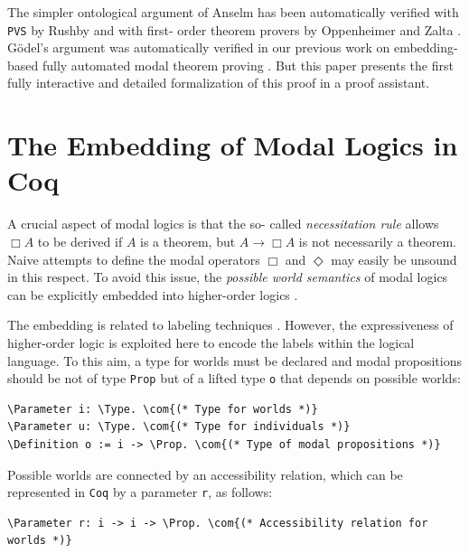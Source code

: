 \documentclass{llncs}
\newcommand{\imp}{\rightarrow}
\newcommand{\red}[1]{\textcolor[rgb]{1,0,0}{#1}}
\newcommand{\blue}[1]{\textcolor[rgb]{0,0,1}{#1}}
\newcommand{\brown}[1]{\textcolor[rgb]{0.8,0.6,0.4}{#1}}
\newcommand{\Parameter}{\red{Parameter}}
\newcommand{\Definition}{\red{Definition}}
\newcommand{\Prop}{\blue{Prop}}
\newcommand{\Type}{\blue{Type}}
\newcommand{\com}[1]{\brown{#1}}
\newcommand{\Coq}{\texttt{Coq}\xspace}
\begin{document}
The simpler ontological argument of Anselm has been automatically
verified with \texttt{PVS} by Rushby \cite{Rushby} and with first-
order theorem provers by Oppenheimer and Zalta \cite{Zalta}. Gödel's
argument was automatically verified in our previous work on embedding-
based fully automated modal theorem proving \cite{ArXiv,AFP}. But this
paper presents the first fully interactive and detailed formalization
of this proof in a proof assistant.



\section{The Embedding of Modal Logics in Coq}
\label{sec:Embedding}

A crucial aspect of modal logics \cite{ModalLogic} is that the so-
called \emph{necessitation rule} allows $\Box A$ to be derived if $A$
is a theorem, but $A \imp \Box A$ is not necessarily a theorem. Naive
attempts to define the modal operators $\Box$ and $\Diamond$ may
easily be unsound in this respect. To avoid this issue, the
\emph{possible world semantics} of modal logics can be explicitly
embedded into higher-order logics \cite{J23,B9}.

The embedding is related to labeling techniques \cite{Labels}.
However, the expressiveness of higher-order logic is exploited here to
encode the labels within the logical language. To this aim, a type for
worlds must be declared and modal propositions should be not of type
\texttt{Prop} but of a lifted type \texttt{o} that depends on possible
worlds:

\newcommand{\verbsize}{\small}

\begin{small}
\begin{Verbatim}[commandchars=\\\{\},fontsize=\verbsize]
\Parameter i: \Type. \com{(* Type for worlds *)}
\Parameter u: \Type. \com{(* Type for individuals *)}
\Definition o := i -> \Prop. \com{(* Type of modal propositions *)}
\end{Verbatim}
\end{small}

\noindent
Possible worlds are connected by an accessibility relation, 
which can be represented in \Coq by a parameter \texttt{r}, as follows:

\begin{small}
\begin{Verbatim}[commandchars=\\\{\},fontsize=\verbsize]
\Parameter r: i -> i -> \Prop. \com{(* Accessibility relation for worlds *)}
\end{Verbatim}
\end{small}
\end{document}
